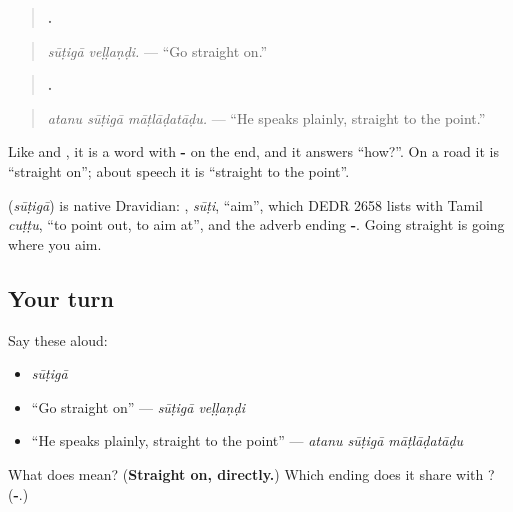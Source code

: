 \begin{quote}
\textbf{ .}
\end{quote}

\begin{quote}
\emph{sūṭigā veḷḷaṇḍi.} — \textquotedblleft{}Go straight on.\textquotedblright{}
\end{quote}

\begin{quote}
\textbf{  .}
\end{quote}

\begin{quote}
\emph{atanu sūṭigā māṭlāḍatāḍu.} — \textquotedblleft{}He speaks plainly, straight to the point.\textquotedblright{}
\end{quote}

Like \textbf{} and \textbf{}, it is a word with \textbf{-} on the end, and it answers \textquotedblleft{}how?\textquotedblright{}. On a road it is \textquotedblleft{}straight on\textquotedblright{}; about speech it is \textquotedblleft{}straight to the point\textquotedblright{}.

\begin{cousinweb}
\textbf{} (\emph{sūṭigā}) is native Dravidian: \textbf{}, \emph{sūṭi}, \textquotedblleft{}aim\textquotedblright{}, which DEDR 2658 lists with Tamil \emph{cuṭṭu}, \textquotedblleft{}to point out, to aim at\textquotedblright{}, and the adverb ending \textbf{-}. Going straight is going where you aim.
\end{cousinweb}

\subsection*{Your turn}
Say these aloud:

\begin{itemize}
\raggedright
  \item \emph{sūṭigā}
  \item \textquotedblleft{}Go straight on\textquotedblright{} — \emph{sūṭigā veḷḷaṇḍi}
  \item \textquotedblleft{}He speaks plainly, straight to the point\textquotedblright{} — \emph{atanu sūṭigā māṭlāḍatāḍu}
\end{itemize}

\begin{tcolorbox}[breakable,colback=teal!4,colframe=teal!35!black,title={Before you move on}]
What does \textbf{} mean? (\textbf{Straight on, directly.}) Which ending does it share with \textbf{}? (\textbf{-}.)
\end{tcolorbox}

